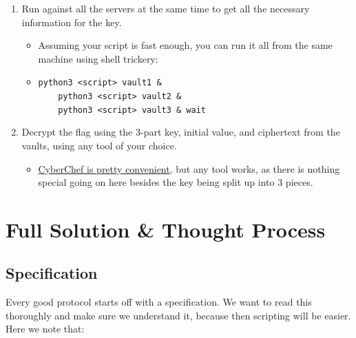 \documentclass[11pt]{article}
\begin{document}
\begin{enumerate}
\begin{itemize}
        \end{itemize}
        \item Run against all the servers at the same time to get all the necessary information for the key.
        \begin{itemize}
            \item Assuming your script is fast enough, you can run it all from the same machine using shell trickery:
            \item \verb`python3 <script> vault1 &` \\
            \verb`    python3 <script> vault2 &` \\
            \verb`    python3 <script> vault3 & wait`
        \end{itemize}
        \item Decrypt the flag using the 3-part key, initial value, and ciphertext from the vaults, using any tool of your choice.
        \begin{itemize}
            \item \href{https://gchq.github.io/CyberChef}{CyberChef is pretty convenient}, but any tool works, as there is nothing special going on here besides the key being split up into 3 pieces.
        \end{itemize}
    \end{enumerate}

    \pagebreak


    \section{Full Solution \& Thought Process}\label{sec:full-solution-thought-process}

    \subsection{Specification}\label{subsec:specification}

    Every good protocol starts off with a specification. We want to read this thoroughly and make sure we understand it, because then scripting will be easier. Here we note that:
\end{document}
